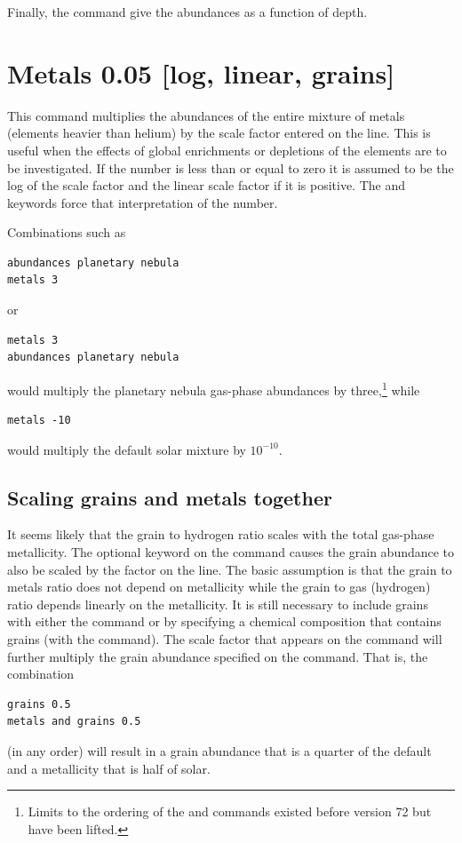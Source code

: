 Finally, the  command give the abundances
as a function of depth.

\section{Metals 0.05 [log, linear, grains]}

This command multiplies the abundances of the entire mixture of metals
(elements heavier than helium) by the scale factor entered on the line.
This is useful when the effects of global enrichments or depletions of the
elements are to be investigated.  If the number is less than or equal to
zero it is assumed to be the log of the scale factor and the linear scale
factor if it is positive.
The  and  keywords force that
interpretation of the number.

Combinations such as
\begin{verbatim}
abundances planetary nebula
metals 3
\end{verbatim}
or
\begin{verbatim}
metals 3
abundances planetary nebula
\end{verbatim}
would multiply the planetary nebula gas-phase abundances by
three,\footnote{Limits to the ordering of the  and
 commands existed
before version 72 but have been lifted.} while
\begin{verbatim}
metals -10
\end{verbatim}
would multiply the default solar mixture by $10^{-10}$.

\subsection{Scaling grains and metals together}

It seems likely that the grain to hydrogen ratio scales with the total
gas-phase metallicity.
The optional keyword  on the
 command
causes the grain abundance to also be scaled by the factor on the line.
The basic assumption is that the grain to metals ratio does not depend on
metallicity while the grain to gas (hydrogen) ratio depends linearly on
the metallicity.  It is still necessary to include grains with either the
 command or by specifying a chemical composition
that contains grains
(with the  command).
The scale factor that appears on
the 
command will further multiply the grain abundance specified
on the  command.
That is, the combination
\begin{verbatim}
grains 0.5
metals and grains 0.5
\end{verbatim}
(in any order) will result in a grain abundance that is a
quarter of the
default and a metallicity that is half of solar.

